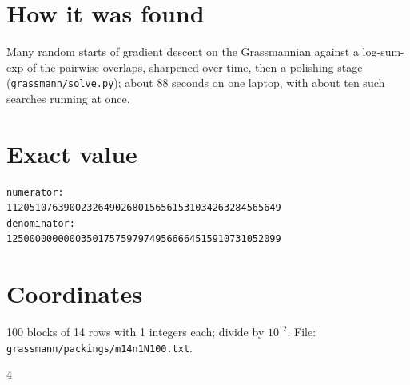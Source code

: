 \documentclass[11pt,a4paper]{article}
\begin{document}
\section{How it was found}
Many random starts of gradient descent on the Grassmannian against a log-sum-exp of the pairwise overlaps, sharpened over time, then a polishing stage (\texttt{grassmann/solve.py}); about 88 seconds on one laptop, with about ten such searches running at once.


\appendix
\section{Exact value}
{\small
\begin{verbatim}
numerator:
112051076390023264902680156561531034263284565649
denominator:
125000000000035017575979749566664515910731052099
\end{verbatim}}

\section{Coordinates}
100 blocks of 14 rows with 1 integers each; divide by $10^{12}$. File: \texttt{grassmann/packings/m14n1N100.txt}.
{\tiny
\begin{multicols}{4}
\end{multicols}}
\end{document}
